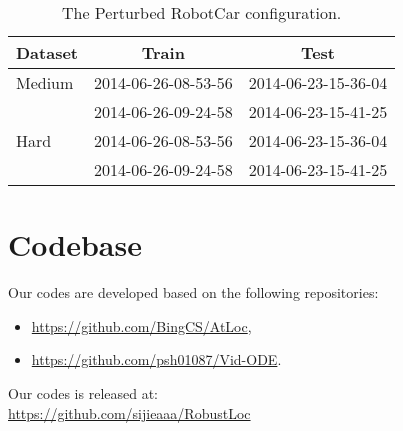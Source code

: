 \documentclass[letterpaper]{article} \usepackage{aaai23}  \usepackage{times}  \usepackage{helvet}  \usepackage{courier}  \usepackage[hyphens]{url}  \usepackage{graphicx} \urlstyle{rm} \def\UrlFont{\rm}  \usepackage{natbib}  \usepackage{caption} \frenchspacing  \setlength{\pdfpagewidth}{8.5in} \setlength{\pdfpageheight}{11in} \usepackage{booktabs}
\theoremstyle{remark}
\theoremstyle{plain}
\begin{document}
\begin{table}[!htb]\footnotesize
\centering
\begin{tabular}{l | c  |  c   } 
\toprule
Dataset & Train & Test \\
\midrule
Medium
&  2014-06-26-08-53-56  &  2014-06-23-15-36-04 \\
&  2014-06-26-09-24-58  &  2014-06-23-15-41-25 \\
\midrule
Hard
&  2014-06-26-08-53-56  &  2014-06-23-15-36-04 \\
&  2014-06-26-09-24-58  &  2014-06-23-15-41-25 \\
\bottomrule
\end{tabular}
\caption{The Perturbed RobotCar configuration.}
\label{stab:perturbed robotcar config}
\end{table}






\section{Codebase}
Our codes are developed based on the following repositories:
\begin{itemize}
\item \url{https://github.com/BingCS/AtLoc},
\item \url{https://github.com/psh01087/Vid-ODE}.
\end{itemize}
Our codes is released at:\\
\url{https://github.com/sijieaaa/RobustLoc}
\end{document}
